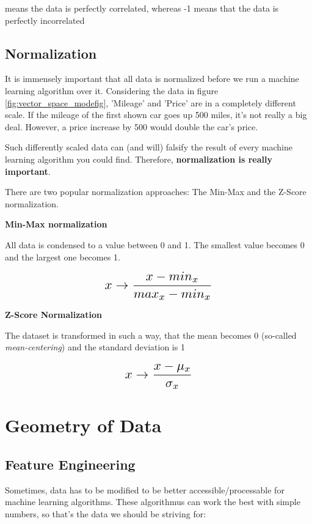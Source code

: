 \documentclass[a4paper, 11pt]{article}
\begin{document}
 means the data is perfectly correlated, whereas -1 means that the data is perfectly incorrelated

\subsection{Normalization}
It is immensely important that all data is normalized before we run a machine learning algorithm over it. Considering the data in figure \ref{fig:vector_space_modefig}, 'Mileage' and 'Price' are in a completely different scale. If the mileage of the first shown car goes up 500 miles, it's not really a big deal. However, a price increase by 500 would double the car's price.

Such differently scaled data can (and will) falsify the result of every machine learning algorithm you could find. Therefore, \textbf{normalization is really important}.

\vspace{10px}

\noindent There are two popular normalization approaches: The Min-Max and the Z-Score normalization. 

\newpage

\noindent \textbf{Min-Max normalization}

\noindent All data is condensed to a value between 0 and 1. The smallest value becomes 0 and the largest one becomes 1.

\[\scalebox{1.5}{
        $x \rightarrow \dfrac{x - min_{x}}{max_{x}-min_{x}}$
}\]

\noindent \textbf{Z-Score Normalization}

\noindent The dataset is transformed in such a way, that the mean becomes 0 (so-called \textit{mean-centering}) and the standard deviation is 1

\[\scalebox{1.5}{
        $x \rightarrow \dfrac{x - \mu_{x}}{\sigma_{x}}$
}\]

\section{Geometry of Data}

\subsection{Feature Engineering}

Sometimes, data has to be modified to be better accessible/processable for machine learning algorithms. These algorithmus can work the best with simple numbers, so that's the data we should be striving for:
\end{document}
